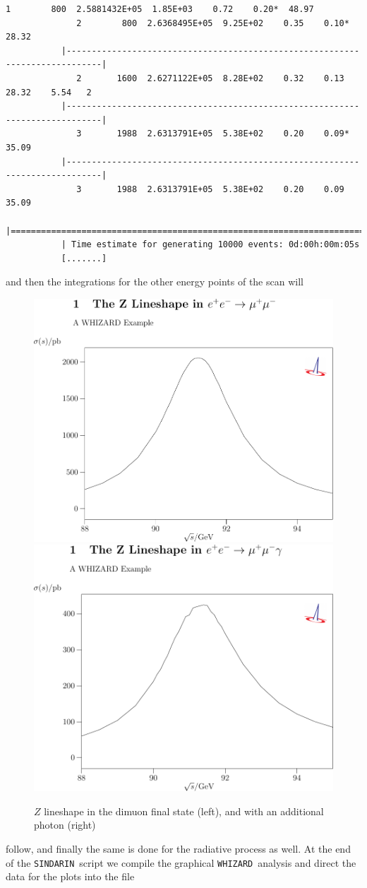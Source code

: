\documentclass[12pt]{book}
\newcommand{\ttt}[1]{\texttt{#1}}
\newcommand{\whizard}{\ttt{WHIZARD}}
\newcommand{\sindarin}{\ttt{SINDARIN}}
\begin{document}
\begin{scriptsize}
\begin{Verbatim}[frame=single]
              1        800  2.5881432E+05  1.85E+03    0.72    0.20*  48.97
              2        800  2.6368495E+05  9.25E+02    0.35    0.10*  28.32
           |-----------------------------------------------------------------------------|
              2       1600  2.6271122E+05  8.28E+02    0.32    0.13   28.32    5.54   2
           |-----------------------------------------------------------------------------|
              3       1988  2.6313791E+05  5.38E+02    0.20    0.09*  35.09
           |-----------------------------------------------------------------------------|
              3       1988  2.6313791E+05  5.38E+02    0.20    0.09   35.09
           |=============================================================================|
           | Time estimate for generating 10000 events: 0d:00h:00m:05s
           [.......]
\end{Verbatim}
\end{scriptsize} %
and then the integrations for the other energy points of the scan will
\begin{figure}
  \centering
  \includegraphics[width=.47\textwidth]{Z-lineshape_1}
  \includegraphics[width=.47\textwidth]{Z-lineshape_2}
\caption{\label{fig:zlineshape} $Z$ lineshape in the dimuon final
  state (left), and with an additional photon (right)}
\end{figure}
follow, and finally the same is done for the radiative process as
well. At the end of the \sindarin\ script we compile the graphical
\whizard\ analysis and direct the data for the plots into the file
\end{document}
